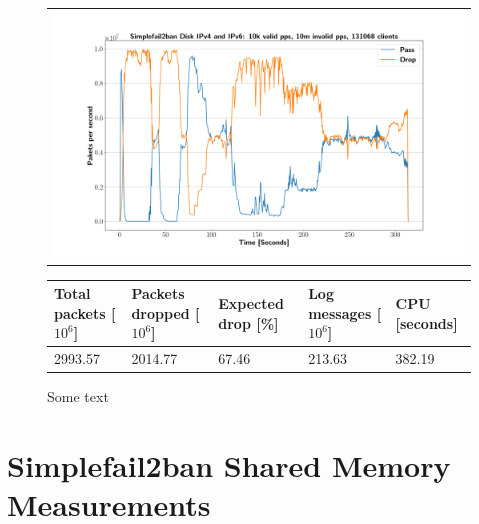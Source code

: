 \begin{figure}[p]
	\label{fig:simplefail2ban:disk:ip46:10m}
	\centering
	\scriptsize
	\begin{tabular}{c}
    	\centerline{\includegraphics[width=1.2\textwidth]{images/simplefail2ban_disk_ipv46_v10k_iv10m_c131068.png}}
	\end{tabular}
	\begin{tabular}{lllll}
		\toprule
		\textbf{Total packets [$10^6$]} & \textbf{Packets dropped [$10^6$]} & \textbf{Expected drop [\%]} & \textbf{Log messages [$10^6$]} & \textbf{CPU [seconds]} \\ \midrule 
		2993.57 & 2014.77 & 67.46 & 213.63 & 382.19 \\
		\bottomrule
	\end{tabular}
	\caption[Simplefail2ban Logfile IPv4 \& IPv6 10m PPS]{Some text}
\end{figure}

\section{Simplefail2ban Shared Memory Measurements}

